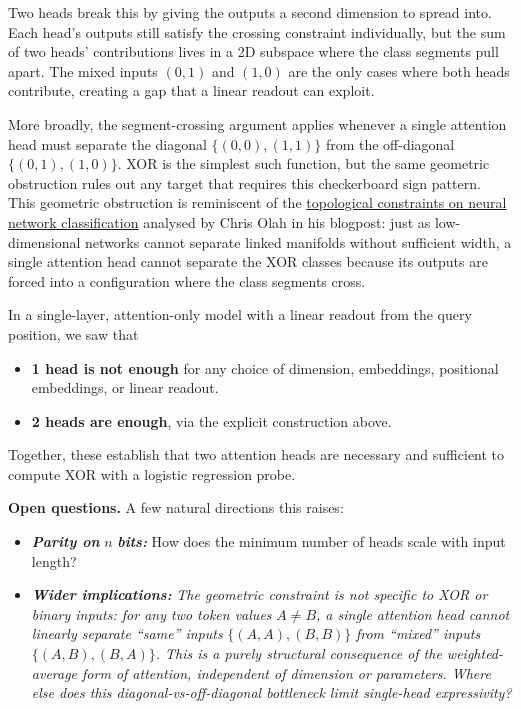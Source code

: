\documentclass[
  11pt,
]{article}
\providecommand{\tightlist}{%
  \setlength{\itemsep}{0pt}\setlength{\parskip}{0pt}}
\begin{document}
Two heads break this by giving the outputs a second dimension to spread
into. Each head's outputs still satisfy the crossing constraint
individually, but the sum of two heads' contributions lives in a 2D
subspace where the class segments pull apart. The mixed inputs \((0,1)\)
and \((1,0)\) are the only cases where both heads contribute, creating a
gap that a linear readout can exploit.

More broadly, the segment-crossing argument applies whenever a single
attention head must separate the diagonal \(\{(0,0),(1,1)\}\) from the
off-diagonal \(\{(0,1),(1,0)\}\). XOR is the simplest such function, but
the same geometric obstruction rules out any target that requires this
checkerboard sign pattern. This geometric obstruction is reminiscent of
the
\href{https://colah.github.io/posts/2014-03-NN-Manifolds-Topology/}{topological
constraints on neural network classification} analysed by Chris Olah in
his blogpost: just as low-dimensional networks cannot separate linked
manifolds without sufficient width, a single attention head cannot
separate the XOR classes because its outputs are forced into a
configuration where the class segments cross.

In a single-layer, attention-only model with a linear readout from the
query position, we saw that

\begin{itemize}
\tightlist
\item
  \textbf{1 head is not enough} for any choice of dimension, embeddings,
  positional embeddings, or linear readout.
\item
  \textbf{2 heads are enough}, via the explicit construction above.
\end{itemize}

Together, these establish that two attention heads are necessary and
sufficient to compute XOR with a logistic regression probe.

\textbf{Open questions.} A few natural directions this raises:

\begin{itemize}
\tightlist
\item
  \textbf{\emph{Parity on}} \(n\) \textbf{\emph{bits:}} How does the
  minimum number of heads scale with input length?
\item
  \textbf{\emph{Wider implications:}} \emph{The geometric constraint is
  not specific to XOR or binary inputs: for any two token values}
  \(A \neq B\)\emph{, a single attention head cannot linearly separate
  ``same'' inputs} \(\{(A,A),(B,B)\}\) \emph{from ``mixed'' inputs}
  \(\{(A,B),(B,A)\}\)\emph{. This is a purely structural consequence of
  the weighted-average form of attention, independent of dimension or
  parameters. Where else does this diagonal-vs-off-diagonal bottleneck
  limit single-head expressivity?}
\end{itemize}
\end{document}
